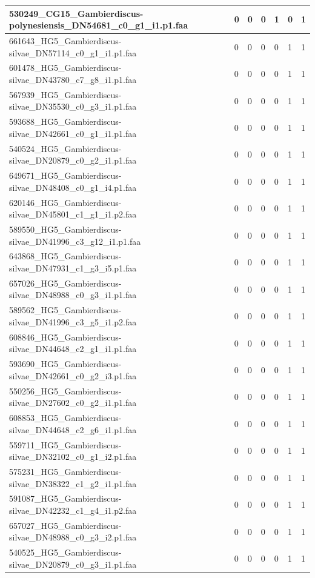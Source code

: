 \documentclass[12pt]{article}
\begin{document}
\begin{longtable}{ | p{2cm} | p{2cm} |p{2.5cm} | p{2cm} | p{2.5cm} |  p{2cm} | p{2cm} |}
 \hline 
530249\_CG15\_Gambierdiscus-polynesiensis\_DN54681\_c0\_g1\_i1.p1.faa&0&0&0&1&0&1\\ 
 \hline 
661643\_HG5\_Gambierdiscus-silvae\_DN57114\_c0\_g1\_i1.p1.faa&0&0&0&0&1&1\\ 
 \hline 
601478\_HG5\_Gambierdiscus-silvae\_DN43780\_c7\_g8\_i1.p1.faa&0&0&0&0&1&1\\ 
 \hline 
567939\_HG5\_Gambierdiscus-silvae\_DN35530\_c0\_g3\_i1.p1.faa&0&0&0&0&1&1\\ 
 \hline 
593688\_HG5\_Gambierdiscus-silvae\_DN42661\_c0\_g1\_i1.p1.faa&0&0&0&0&1&1\\ 
 \hline 
540524\_HG5\_Gambierdiscus-silvae\_DN20879\_c0\_g2\_i1.p1.faa&0&0&0&0&1&1\\ 
 \hline 
649671\_HG5\_Gambierdiscus-silvae\_DN48408\_c0\_g1\_i4.p1.faa&0&0&0&0&1&1\\ 
 \hline 
620146\_HG5\_Gambierdiscus-silvae\_DN45801\_c1\_g1\_i1.p2.faa&0&0&0&0&1&1\\ 
 \hline 
589550\_HG5\_Gambierdiscus-silvae\_DN41996\_c3\_g12\_i1.p1.faa&0&0&0&0&1&1\\ 
 \hline 
643868\_HG5\_Gambierdiscus-silvae\_DN47931\_c1\_g3\_i5.p1.faa&0&0&0&0&1&1\\ 
 \hline 
657026\_HG5\_Gambierdiscus-silvae\_DN48988\_c0\_g3\_i1.p1.faa&0&0&0&0&1&1\\ 
 \hline 
589562\_HG5\_Gambierdiscus-silvae\_DN41996\_c3\_g5\_i1.p2.faa&0&0&0&0&1&1\\ 
 \hline 
608846\_HG5\_Gambierdiscus-silvae\_DN44648\_c2\_g1\_i1.p1.faa&0&0&0&0&1&1\\ 
 \hline 
593690\_HG5\_Gambierdiscus-silvae\_DN42661\_c0\_g2\_i3.p1.faa&0&0&0&0&1&1\\ 
 \hline 
550256\_HG5\_Gambierdiscus-silvae\_DN27602\_c0\_g2\_i1.p1.faa&0&0&0&0&1&1\\ 
 \hline 
608853\_HG5\_Gambierdiscus-silvae\_DN44648\_c2\_g6\_i1.p1.faa&0&0&0&0&1&1\\ 
 \hline 
559711\_HG5\_Gambierdiscus-silvae\_DN32102\_c0\_g1\_i2.p1.faa&0&0&0&0&1&1\\ 
 \hline 
575231\_HG5\_Gambierdiscus-silvae\_DN38322\_c1\_g2\_i1.p1.faa&0&0&0&0&1&1\\ 
 \hline 
591087\_HG5\_Gambierdiscus-silvae\_DN42232\_c1\_g4\_i1.p2.faa&0&0&0&0&1&1\\ 
 \hline 
657027\_HG5\_Gambierdiscus-silvae\_DN48988\_c0\_g3\_i2.p1.faa&0&0&0&0&1&1\\ 
 \hline 
540525\_HG5\_Gambierdiscus-silvae\_DN20879\_c0\_g3\_i1.p1.faa&0&0&0&0&1&1\\ 

\end{longtable}
\end{document}
